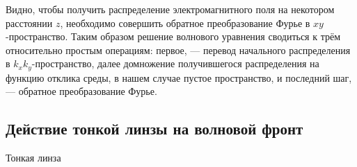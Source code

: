 \documentclass[14pt,a4paper]{extarticle}
\numberwithin{equation}{section}
\begin{document}
Видно, чтобы получить распределение электромагнитного поля на некотором расстоянии $z$, необходимо совершить обратное преобразование Фурье в $xy$-пространство. Таким образом решение волнового уравнения сводиться к трём относительно простым операциям: первое, --- перевод начального распределения в $k_xk_y$-пространство, далее домножение получившегося распределения на функцию отклика среды, в нашем случае пустое пространство, и последний шаг, --- обратное преобразование Фурье. 

\subsection{Действие тонкой линзы на волновой фронт}
Тонкая линза 
\end{document}
